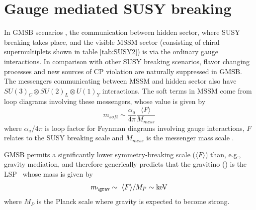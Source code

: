 \section{Gauge mediated SUSY breaking}
\label{sec:gmsb}
In GMSB scenarios \cite{Dine:1993yw,Dine:1994vc,Dine:1995ag,Meade:2008wd,Giudice:1998bp,Grajek:2013ola}, the communication between hidden 
sector, where SUSY breaking takes place, and the visible MSSM sector (consisting of chiral supermultiplets shown in table \ref{tab:SUSY2}) 
is via the ordinary gauge interactions. In comparison with other SUSY breaking scenarios, flavor changing processes and new sources of CP 
violation are naturally suppressed \cite{Dine:1993yw} in GMSB. The messengers communicating between MSSM and hidden sector also have 
$SU(3)_C \otimes SU(2)_L \otimes U(1)_Y$ interactions. The soft terms in MSSM come from loop diagrams involving these messengers, whose 
value is given by
\begin{equation}
m_{soft} \sim \frac{\alpha_{a}}{4\pi} \frac{\langle F \rangle}{M_{mess}}
\end{equation}
where $\alpha_{a}/{4\pi}$ is loop factor for Feynman diagrams involving gauge interactions, $F$ relates to the SUSY breaking scale and 
$M_{mess}$ is the messenger mass scale \cite{Martin:1997ns}.

GMSB permits a significantly lower symmetry-breaking scale ($\langle F\rangle$) than, e.g., gravity mediation, and therefore generically 
predicts that the gravitino () is the LSP~\cite{Meade:2008wd,PhysRevLett.38.1433,CREMMER1978231} whose mass is given by
\begin{equation}
\label{massGrav}
m_{\grav}  \sim \ \langle F \rangle/M_P \sim \mathrm{keV}
\end{equation}
where $M_P$ is the Planck scale where gravity is expected to become strong.

